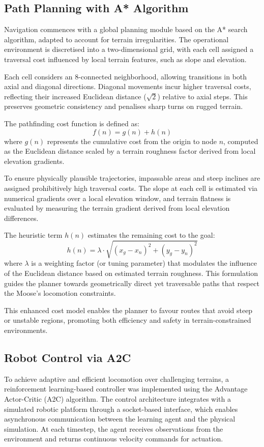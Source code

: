 \documentclass[conference]{IEEEtran}
\begin{document}
\subsection{Path Planning with A* Algorithm}

Navigation commences with a global planning module based on the A* search algorithm, adapted to account for terrain irregularities. The operational environment is discretised into a two-dimensional grid, with each cell assigned a traversal cost influenced by local terrain features, such as slope and elevation.

Each cell considers an 8-connected neighborhood, allowing transitions in both axial and diagonal directions. Diagonal movements incur higher traversal costs, reflecting their increased Euclidean distance ($\sqrt{2}$) relative to axial steps. This preserves geometric consistency and penalises sharp turns on rugged terrain.

The pathfinding cost function is defined as:
\[
f(n) = g(n) + h(n)
\]
where $g(n)$ represents the cumulative cost from the origin to node $n$, computed as the Euclidean distance scaled by a terrain roughness factor derived from local elevation gradients. 

To ensure physically plausible trajectories, impassable areas and steep inclines are assigned prohibitively high traversal costs. The slope at each cell is estimated via numerical gradients over a local elevation window, and terrain flatness is evaluated by measuring the terrain gradient derived from local elevation differences.

The heuristic term \(h(n)\) estimates the remaining cost to the goal:
\[
h(n) = \lambda \cdot \sqrt{(x_g - x_n)^2 + (y_g - y_n)^2}
\]
where \(\lambda\) is a weighting factor (or tuning parameter) that modulates the influence of the Euclidean distance based on estimated terrain roughness. This formulation guides the planner towards geometrically direct yet traversable paths that respect the Moose’s locomotion constraints.

This enhanced cost model enables the planner to favour routes that avoid steep or unstable regions, promoting both efficiency and safety in terrain-constrained environments.

\subsection{Robot Control via A2C}

To achieve adaptive and efficient locomotion over challenging terrains, a reinforcement learning-based controller was implemented using the Advantage Actor-Critic (A2C) algorithm. The control architecture integrates with a simulated robotic platform through a socket-based interface, which enables asynchronous communication between the learning agent and the physical simulation. At each timestep, the agent receives observations from the environment and returns continuous velocity commands for actuation.
\end{document}
